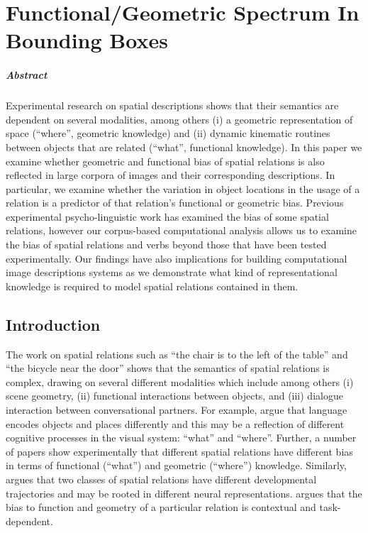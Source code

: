 
\chapter{Functional/Geometric Spectrum In 
Bounding Boxes}

\paragraph{Abstract}
  Experimental research on spatial descriptions shows that their
  semantics are dependent on several modalities, among others (i) a
  geometric representation of space (``where'', geometric knowledge)
  and (ii) dynamic kinematic routines between objects that are related
  (``what'', functional knowledge). In this paper we examine whether
  geometric and functional bias of spatial relations is also reflected
  in large corpora of images and their corresponding descriptions. In
  particular, we examine whether the variation in object locations in the usage of a relation is a
  predictor of that relation's functional or geometric bias. Previous experimental psycho-linguistic work has examined the bias of some spatial relations, however our corpus-based computational analysis allows us to examine the bias of spatial relations and verbs beyond those that have been tested experimentally.  Our findings have also implications for
  building computational image descriptions systems as we demonstrate
  what kind of representational knowledge is required to model spatial
  relations contained in them.


\section{Introduction}\label{sc2020:sec:introduction}

The work on spatial relations such as ``the chair is to the left of
the table'' and ``the bicycle near the door'' shows that the semantics
of spatial relations is complex, drawing on several different
modalities which include among others (i) scene geometry, (ii)
functional interactions between objects, and (iii) dialogue
interaction between conversational partners. %
For example, \cite{Landau:1993aa} argue that language encodes objects
and places differently and this may be a reflection of different
cognitive processes in the visual system: ``what'' and ``where''.
Further, a number of papers \cite{CoventryEtAl:2001,Coventry:2004aa,Coventry:2005aa,Horberg:2008aa}
show experimentally that different spatial relations have different
bias in terms of functional (``what'') and geometric (``where'')
knowledge. Similarly, \cite{Landau:2016aa} argues that two classes of
spatial relations have different developmental trajectories and may be
rooted in different neural representations. \cite{Dobnik:2017ac}
argues that the bias to function and geometry of a particular relation
is contextual and task-dependent.

